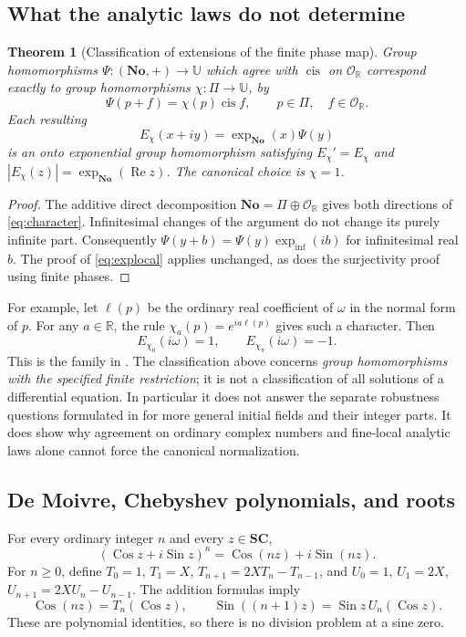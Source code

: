\documentclass[11pt,letterpaper]{article}
\newtheorem{theorem}{Theorem}[section]
\theoremstyle{definition}
\theoremstyle{remark}
\newcommand{\No}{\mathbf{No}}
\newcommand{\SC}{\mathbf{SC}}
\newcommand{\R}{\mathbb R}\newcommand{\C}{\mathbb C}
\newcommand{\OO}{\mathcal O}\newcommand{\mm}{\mathfrak m}
\newcommand{\UU}{\mathbb U}\newcommand{\HH}{\mathcal H}
\newcommand{\cis}{\operatorname{cis}}
\newcommand{\Sin}{\operatorname{Sin}}
\newcommand{\Cos}{\operatorname{Cos}}
\newcommand{\expi}{\operatorname{exp}_{\mathrm{inf}}}
\newcommand{\re}{\operatorname{Re}}\newcommand{\im}{\operatorname{Im}}
\numberwithin{equation}{section}
\begin{document}
\subsection{What the analytic laws do not determine}\label{sec:freedom}
\begin{theorem}[Classification of extensions of the finite phase map]\label{thm:characters}
Group homomorphisms $\Psi:(\No,+)\to\UU$ which agree with $\cis$ on $\OO_{\R}$ correspond exactly to group homomorphisms $\chi:\Pi\to\UU$, by
\begin{equation}\label{eq:character}
 \Psi(p+f)=\chi(p)\cis f,\qquad p\in\Pi,\quad f\in\OO_{\R}.
\end{equation}
Each resulting
\[
 E_\chi(x+iy)=\exp_{\No}(x)\Psi(y)
\]
is an onto exponential group homomorphism satisfying $E_\chi'=E_\chi$ and $|E_\chi(z)|=\exp_{\No}(\re z)$. The canonical choice is $\chi=1$.
\end{theorem}
\begin{proof}
The additive direct decomposition $\No=\Pi\oplus\OO_{\R}$ gives both directions of \eqref{eq:character}. Infinitesimal changes of the argument do not change its purely infinite part. Consequently $\Psi(y+b)=\Psi(y)\expi(ib)$ for infinitesimal real $b$. The proof of \eqref{eq:explocal} applies unchanged, as does the surjectivity proof using finite phases.
\end{proof}
For example, let $\ell(p)$ be the ordinary real coefficient of $\omega$ in the normal form of $p$. For any $a\in\R$, the rule $\chi_a(p)=e^{ia\ell(p)}$ gives such a character. Then
\[
 E_{\chi_0}(i\omega)=1,\qquad E_{\chi_\pi}(i\omega)=-1.
\]
This is the family in \cite{InputAnalysis}. The classification above concerns \emph{group homomorphisms with the specified finite restriction}; it is not a classification of all solutions of a differential equation. In particular it does not answer the separate robustness questions formulated in \cite[\S11]{EK} for more general initial fields and their integer parts. It does show why agreement on ordinary complex numbers and fine-local analytic laws alone cannot force the canonical normalization.

\subsection{De Moivre, Chebyshev polynomials, and roots}
For every ordinary integer $n$ and every $z\in\SC$,
\[
 (\Cos z+i\Sin z)^n=\Cos(nz)+i\Sin(nz).
\]
For $n\ge0$, define $T_0=1$, $T_1=X$, $T_{n+1}=2XT_n-T_{n-1}$, and $U_0=1$, $U_1=2X$, $U_{n+1}=2XU_n-U_{n-1}$. The addition formulas imply
\[
 \Cos(nz)=T_n(\Cos z),\qquad
 \Sin((n+1)z)=\Sin z\,U_n(\Cos z).
\]
These are polynomial identities, so there is no division problem at a sine zero.
\end{document}
